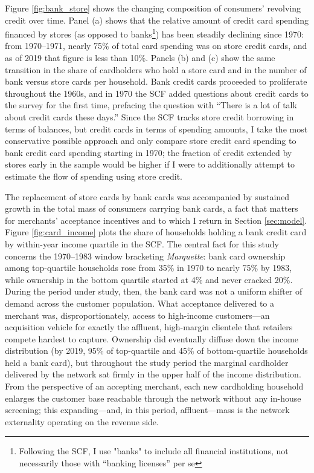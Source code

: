 \documentclass[12pt,english]{article}
\begin{document}
Figure \ref{fig:bank_store} shows the changing composition of consumers' revolving credit over time. Panel (a) shows that the relative amount of credit card spending financed by stores (as opposed to banks\footnote{Following the SCF, I use "banks" to include all financial institutions, not necessarily those with ``banking licenses'' per se}) has been steadily declining since 1970: from 1970--1971, nearly 75\% of total card spending was on store credit cards, and as of 2019 that figure is less than 10\%. Panels (b) and (c) show the same transition in the share of cardholders who hold a store card and in the number of bank versus store cards per household. Bank credit cards proceeded to proliferate throughout the 1960s, and in 1970 the SCF added questions about credit cards to the survey for the first time, prefacing the question with ``There is a lot of talk about credit cards these days.'' Since the SCF tracks store credit borrowing in terms of balances, but credit cards in terms of spending amounts, I take the most conservative possible approach and only compare store credit card spending to bank credit card spending starting in 1970; the fraction of credit extended by stores early in the sample would be higher if I were to additionally attempt to estimate the flow of spending using store credit.

The replacement of store cards by bank cards was accompanied by sustained growth in the total mass of consumers carrying bank cards, a fact that matters for merchants' acceptance incentives and to which I return in Section \ref{sec:model}. Figure \ref{fig:card_income} plots the share of households holding a bank credit card by within-year income quartile in the SCF. The central fact for this study concerns the 1970--1983 window bracketing \emph{Marquette}: bank card ownership among top-quartile households rose from 35\% in 1970 to nearly 75\% by 1983, while ownership in the bottom quartile started at 4\% and never cracked 20\%. During the period under study, then, the bank card was not a uniform shifter of demand across the customer population. What acceptance delivered to a merchant was, disproportionately, access to high-income customers---an acquisition vehicle for exactly the affluent, high-margin clientele that retailers compete hardest to capture. Ownership did eventually diffuse down the income distribution (by 2019, 95\% of top-quartile and 45\% of bottom-quartile households held a bank card), but throughout the study period the marginal cardholder delivered by the network sat firmly in the upper half of the income distribution. From the perspective of an accepting merchant, each new cardholding household enlarges the customer base reachable through the network without any in-house screening; this expanding---and, in this period, affluent---mass is the network externality operating on the revenue side.
\end{document}
